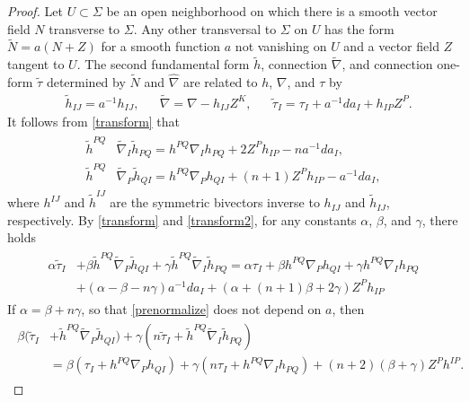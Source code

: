 \documentclass [leqno, 10pt]{amsart}
\theoremstyle{definition}
\numberwithin{equation}{section}
\newcommand{\al}{\alpha}
\newcommand{\be}{\beta}
\newcommand{\ga}{\gamma}
\newcommand{\hnabla}{\widehat{\nabla}}
\newcommand{\tnabla}{\tilde{\nabla}}
\begin{document}
\begin{proof}
Let $U \subset \Sigma$ be an open neighborhood on which there is a smooth vector field $N$ transverse to $\Sigma$. Any other transversal to $\Sigma$ on $U$ has the form $\tilde{N} = a(N + Z)$ for a smooth function $a$ not vanishing on $U$ and a vector field $Z$ tangent to $U$. The second fundamental form $\tilde{h}$, connection $\tnabla$, and connection one-form $\tilde{\tau}$ determined by $\tilde{N}$ and $\hnabla$ are related to $h$, $\nabla$, and $\tau$ by
\begin{align}\label{transform}
&\tilde{h}_{IJ} = a^{-1}h_{IJ},& &\tnabla = \nabla - h_{IJ}Z^{K}, & &\tilde{\tau}_{I} = \tau_{I} + a^{-1}da_{I} + h_{IP}Z^{P}.
\end{align}
It follows from \eqref{transform} that 
\begin{align}\label{transform2}
\begin{split}
\tilde{h}^{PQ}&\tnabla_{I}\tilde{h}_{PQ} = h^{PQ}\nabla_{I}h_{PQ} + 2Z^{P}h_{IP} - n a^{-1}da_{I},\\
\tilde{h}^{PQ}&\tnabla_{P}\tilde{h}_{QI} = h^{PQ}\nabla_{P}h_{QI} + (n+1)Z^{P}h_{IP} - a^{-1}da_{I},
\end{split}
\end{align}
where $h^{IJ}$ and $\tilde{h}^{IJ}$ are the symmetric bivectors inverse to $h_{IJ}$ and $\tilde{h}_{IJ}$, respectively. By \eqref{transform} and \eqref{transform2}, for any constants $\al$, $\be$, and $\ga$, there holds
\begin{align}\label{prenormalize}
\begin{split}
\al \tilde{\tau}_{I} &+ \be \tilde{h}^{PQ}\tnabla_{P}\tilde{h}_{QI} + \ga \tilde{h}^{PQ}\tnabla_{I}\tilde{h}_{PQ} = \al \tau_{I} + \be h^{PQ}\nabla_{P}h_{QI} + \ga h^{PQ}\nabla_{I}h_{PQ} \\
&+ (\al - \be - n \ga)a^{-1}da_{I} + (\al + (n+1)\be + 2\ga)Z^{P}h_{IP}
\end{split}
\end{align}
If $\al = \be + n\ga$, so that \eqref{prenormalize} does not depend on $a$, then 
\begin{align}\label{prenorm}
\begin{split}
\be(\tilde{\tau}_{I} &+  \tilde{h}^{PQ}\tnabla_{P}\tilde{h}_{QI}) + \ga(n\tilde{\tau}_{I} +  \tilde{h}^{PQ}\tnabla_{I}\tilde{h}_{PQ})\\
& = \be(\tau_{I} + h^{PQ}\nabla_{P}h_{QI}) + \ga(n\tau_{I} + h^{PQ}\nabla_{I}h_{PQ}) + (n+2)(\be + \ga)Z^{P}h^{IP}.
\end{split}
\end{align}

\end{proof}
\end{document}
